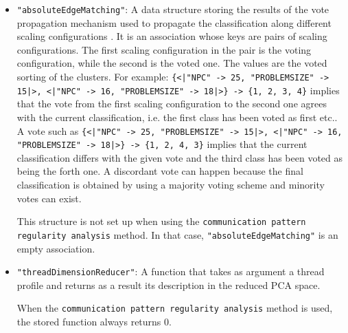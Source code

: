 \documentclass[a4paper, 10pt]{article}
\begin{document}
\begin{itemize}
 \item \verb!"absoluteEdgeMatching"!: A data structure storing the results of the vote propagation mechanism
 used to propagate the classification along different scaling configurations \cite{mariani201Xclassification}.
 It is an association whose keys are pairs of scaling configurations. The first scaling configuration in the pair is the voting configuration,
 while the second is the voted one. The values are the voted sorting of the clusters. For example:
 \texttt{\{<|"NPC" -> 25, 
   "PROBLEMSIZE" -> 15|>, <|"NPC" -> 16, 
   "PROBLEMSIZE" -> 18|>\} -> \{1, 2, 3, 4\}} implies that the vote from the first scaling configuration to the second one agrees with the current
   classification, i.e. the first class has been voted as first etc.. A vote such as
 \texttt{\{<|"NPC" -> 25, 
   "PROBLEMSIZE" -> 15|>, <|"NPC" -> 16, 
   "PROBLEMSIZE" -> 18|>\} -> \{1, 2, 4, 3\}} implies that the current classification differs with the given vote
   and the third class has been voted as being the forth one. A discordant vote can happen because the final classification is obtained by using a
   majority voting scheme and minority votes can exist.
 
 This structure is not set up when using the \texttt{communication pattern regularity analysis} method. In that case, \verb!"absoluteEdgeMatching"!
 is an empty association.
 
 \item \verb!"threadDimensionReducer"!: A function that takes as argument a thread profile and returns as a result its description in the
 reduced PCA space.
 
 When the \texttt{communication pattern regularity analysis} method is used, the stored function always returns  0.
 

\end{itemize}
\end{document}
